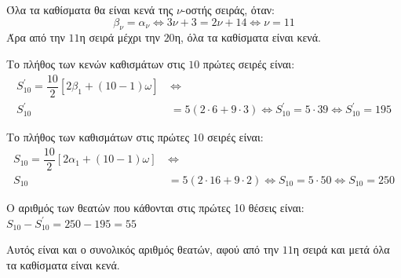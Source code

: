 \begin{alist}
\begin{rlist}
\item Όλα τα καθίσματα θα είναι κενά της $\nu$-οστής σειράς, όταν:
\[\beta_\nu = \alpha_\nu \Leftrightarrow 3\nu + 3 = 2\nu + 14 \Leftrightarrow \nu = 11\]
Άρα από την $11$η σειρά μέχρι την $20$η, όλα τα καθίσματα είναι κενά.

\item Το πλήθος των κενών καθισμάτων στις $10$ πρώτες σειρές είναι:
\begin{align*}
S_{10}^\prime = \dfrac{10}{2}[2\beta_1 + (10 - 1)\omega] \ &\Leftrightarrow \\
S_{10}^\prime &= 5(2 \cdot 6 + 9 \cdot 3) \Leftrightarrow S_{10}^\prime = 5 \cdot 39 \Leftrightarrow S_{10}^\prime = 195
\end{align*}

Το πλήθος των καθισμάτων στις πρώτες $10$ σειρές είναι:
\begin{align*}
S_{10} = \dfrac{10}{2}[2\alpha_1 + (10 - 1)\omega] \ &\Leftrightarrow \\
S_{10} &= 5(2 \cdot 16 + 9 \cdot 2) \Leftrightarrow S_{10} = 5 \cdot 50 \Leftrightarrow S_{10} = 250
\end{align*}

Ο αριθμός των θεατών που κάθονται στις πρώτες 10 θέσεις είναι:
$S_{10} - S_{10}^\prime = 250 - 195 = 55$

Αυτός είναι και ο συνολικός αριθμός θεατών, αφού από την $11$η σειρά και μετά όλα τα καθίσματα είναι κενά.
\end{rlist}
\end{alist}

